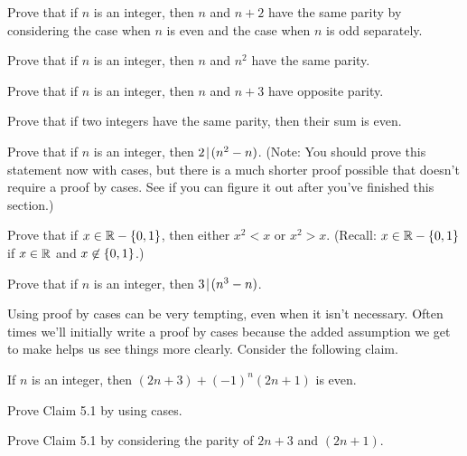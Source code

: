 \begin{question}
\item Prove that if $n$ is an integer, then $n$ and $n+2$ have the same parity by considering the case when $n$ is even and the case when $n$ is odd separately. 

\newpage

\item Prove that if $n$ is an integer, then $n$ and $n^2$ have the same parity.

\vspace{4in}

\item Prove that if $n$ is an integer, then $n$ and $n+3$ have opposite parity.

\newpage
\item Prove that if two integers have the same parity, then their sum is even.

\vspace{4in}

\item Prove that if $n$ is an integer, then $2 \! \mid \! (n^2-n)$.  (Note:  You should prove this statement now with cases, but there is a much shorter proof possible that doesn't require a proof by cases.  See if you can figure it out after you've finished this section.)
\newpage
\item Prove that if $x\in \mathbb{R} -\left\{0,1\right\}$, then either $x^2<x$ or $x^2>x$.  (Recall: $x \in \mathbb{R} - \left\{0,1\right\}$ if $x \in \mathbb{R}$ and $x \not\in \left\{0,1\right\}$.)
\newpage
\item Prove that if $n$ is an integer, then $3 \! \mid \! (n^3-n)$.
\end{question} 
\newpage
Using proof by cases can be very tempting, even when it isn't necessary.  Often times we'll initially write a proof by cases because the added assumption we get to make helps us see things more clearly.  Consider the following claim.
\begin{claim}  If $n$ is an integer, then $(2n+3)+(-1)^n(2n+1)$ is even.
\end{claim}
\begin{question}[resume]
\item Prove Claim 5.1 by using cases.  
\vspace{3.5in}
\item Prove Claim 5.1 by considering the parity of $2n+3$ and $(2n+1)$.
\end{question}





